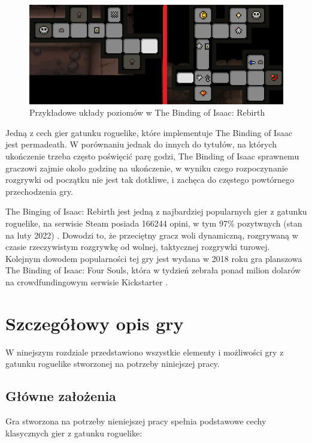 \documentclass[12pt,twoside]{article}
\begin{document}
\FloatBarrier
\begin{figure}[h]
	\centering
	\includegraphics[width=12cm]{images/tboi/scr3.png}
	\caption{Przykładowe układy poziomów w The Binding of Isaac: Rebirth}
	\label{tboi:scr3}
\end{figure}
\FloatBarrier

Jedną z cech gier gatunku roguelike, które implementuje The Binding of Isaac jest permadeath. W porównaniu jednak do innych do tytułów, na których ukończenie trzeba często poświęcić parę godzi, The Binding of Isaac sprawnemu graczowi zajmie około godzinę na ukończenie, w wyniku czego rozpoczynanie rozgrywki od początku nie jest tak dotkliwe, i zachęca do częstego powtórnego przechodzenia gry.


The Binging of Isaac: Rebirth jest jedną z najbardziej popularnych gier z gatunku roguelike, na serwisie Steam posiada 166244 opini, w tym 97\% pozytwnych (stan na luty 2022) \cite{tboi_steam}. Dowodzi to, że przeciętny gracz woli dynamiczną, rozgrywaną w czasie rzeczywistym rozgrywkę od wolnej, taktycznej rozgrywki turowej. Kolejnym dowodem popularności tej gry jest wydana w 2018 roku gra planszowa The Binding of Isaac: Four Souls, która w tydzień zebrała ponad milion dolarów na crowdfundingowym serwisie Kickstarter \cite{tboi_4souls}.



\clearpage	

\section{Szczegółowy opis gry}

W ninejszym rozdziale przedstawiono wszystkie elementy i możliwości gry z gatunku roguelike stworzonej na potrzeby niniejszej pracy.


\subsection{Główne założenia}
Gra stworzona na potrzeby nieniejszej pracy spełnia podstawowe cechy klasycznych gier z gatunku roguelike:
\end{document}
